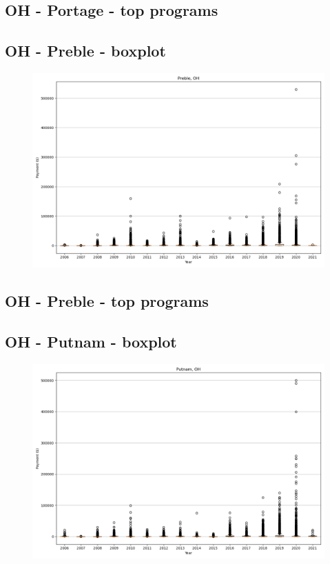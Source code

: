 \subsection*{OH - Portage - top programs}

\newpage
\subsection*{OH - Preble - boxplot}
\begin{figure}[h]
\centering
\includegraphics[width=7in]{../output/boxplots/counties/Preble-OH_boxplot.png}
\end{figure}


\subsection*{OH - Preble - top programs}

\newpage
\subsection*{OH - Putnam - boxplot}
\begin{figure}[h]
\centering
\includegraphics[width=7in]{../output/boxplots/counties/Putnam-OH_boxplot.png}
\end{figure}


